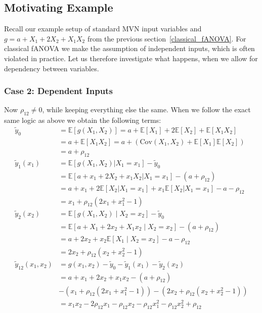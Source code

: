 \subsection{Motivating Example}
Recall our example setup of standard MVN input variables and \(g = a + X_1 + 2X_2 + X_1 X_2\) from the previous section~\ref{classical_fANOVA}.
For classical fANOVA we make the assumption of independent inputs, which is often violated in practice. Let us therefore investigate what happens, when we allow for dependency between variables.

\subsubsection*{Case 2: Dependent Inputs}
Now $\rho_{12} \neq 0$, while keeping everything else the same. When we follow the exact same logic as above we obtain the following terms:
\begin{align*}
\tilde{y}_0 &= \mathbb{E}[g(X_1, X_2)] 
= a + \mathbb{E}[X_1] + 2\mathbb{E}[X_2] + \mathbb{E}[X_1 X_2] \\
&= a + \mathbb{E}[X_1 X_2] 
= a + \left( \text{Cov}(X_1, X_2) + \mathbb{E}[X_1]\mathbb{E}[X_2] \right) \\
&= a + \rho_{12} \\
\tilde{y}_1(x_1) 
&= \mathbb{E}[g(X_1, X_2) | X_1 = x_1] - \tilde{y}_0 \\
&= \mathbb{E}[a + x_1 + 2X_2 + x_1 X_2 | X_1 = x_1] - (a + \rho_{12}) \\
&= a + x_1 + 2\mathbb{E}[X_2 | X_1 = x_1] + x_1 \mathbb{E}[X_2 | X_1 = x_1] - a - \rho_{12} \\
&= x_1 + \rho_{12}(2x_1 + x_1^2 - 1) \\
\tilde{y}_2(x_2) 
&= \mathbb{E}[g(X_1, X_2) \mid X_2 = x_2] - \tilde{y}_0 \\
&= \mathbb{E}[a + X_1 + 2x_2 + X_1 x_2 \mid X_2 = x_2] - (a + \rho_{12}) \\
&= a + 2x_2 + x_2 \mathbb{E}[X_1 \mid X_2 = x_2] - a - \rho_{12} \\
&= 2x_2 + \rho_{12}(x_2 + x_2^2 - 1) \\
\tilde{y}_{12}(x_1, x_2) 
&= g(x_1, x_2) - \tilde{y}_0 - \tilde{y}_1(x_1) - \tilde{y}_2(x_2) \\
&= a + x_1 + 2x_2 + x_1 x_2 - (a + \rho_{12}) \\
&- (x_1 + \rho_{12}(2x_1 + x_1^2 - 1)) - (2x_2 + \rho_{12}(x_2 + x_2^2 - 1)) \\
&= x_1 x_2 - 2\rho_{12} x_1 - \rho_{12} x_2  - \rho_{12} x_1^2  - \rho_{12} x_2^2 + \rho_{12}
\end{align*}

